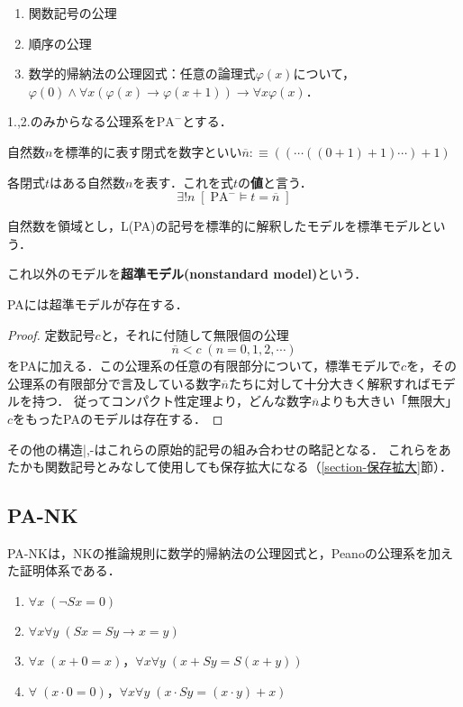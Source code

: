 \documentclass[uplatex, 12pt, dvipdfmx]{jsreport}
\begin{document}
\begin{definition}[PAの公理]\mbox{}
    \begin{enumerate}
        \item 関数記号の公理
        \item 順序の公理
        \item 数学的帰納法の公理図式：任意の論理式$\varphi(x)$について，$\varphi(0)\land\forall x(\varphi(x)\to\varphi(x+1))\to\forall x\varphi(x)$．
    \end{enumerate}
    1.,2.のみからなる公理系を$\mathrm{PA}^-$とする．
\end{definition}
\begin{definition}[numeral]
    自然数$n$を標準的に表す閉式を数字といい$\overline{n}:\equiv((\cdots((0+1)+1)\cdots)+1)$
\end{definition}

\begin{proposition}[value]
    各閉式$t$はある自然数$n$を表す．これを式$t$の\textbf{値}と言う．
    \[\exists! n\;[\;\mathrm{PA}^-\vDash t=\overline{n}\;]\]
\end{proposition}

\begin{definition}
    自然数を領域とし，L(PA)の記号を標準的に解釈したモデルを標準モデルという．

    これ以外のモデルを\textbf{超準モデル(nonstandard model)}という．
\end{definition}
\begin{proposition}
    PAには超準モデルが存在する．
\end{proposition}
\begin{proof}
    定数記号$c$と，それに付随して無限個の公理
    \[\overline{n}<c\;(n=0,1,2,\cdots)\]
    をPAに加える．この公理系の任意の有限部分について，標準モデルで$c$を，その公理系の有限部分で言及している数字$\overline{n}$たちに対して十分大きく解釈すればモデルを持つ．
    従ってコンパクト性定理より，どんな数字$\overline{n}$よりも大きい「無限大」$c$をもったPAのモデルは存在する．
\end{proof}

その他の構造|,-はこれらの原始的記号の組み合わせの略記となる．
これらをあたかも関数記号とみなして使用しても保存拡大になる（\ref{section-保存拡大}節）．

\subsection{PA-NK}

\begin{definition}[Peanoの公理]
    PA-NKは，NKの推論規則に数学的帰納法の公理図式と，Peanoの公理系を加えた証明体系である．
    \begin{enumerate}
        \item $\forall x\;(\lnot Sx=0)$
        \item $\forall x\forall y\;(Sx=Sy\to x=y)$
        \item $\forall x\;(x+0=x)$，$\forall x\forall y\;(x+Sy=S(x+y))$
        \item $\forall\;(x\cdot 0=0)$，$\forall x\forall y\;(x\cdot Sy=(x\cdot y)+x)$
    \end{enumerate}
\end{definition}
\end{document}
